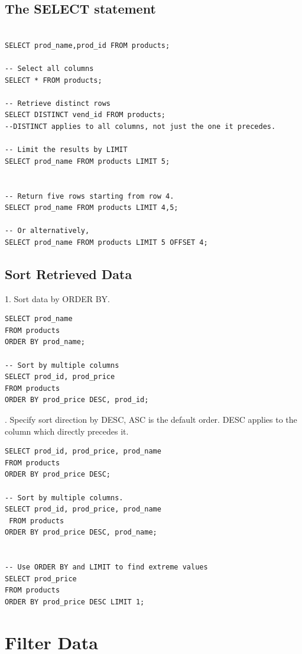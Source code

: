 \documentclass[12pt,oneside,a4paper]{article}
\begin{document}
\subsection{The \textsf{SELECT} statement} 

\begin{lstlisting}

SELECT prod_name,prod_id FROM products;

-- Select all columns 
SELECT * FROM products;

-- Retrieve distinct rows 
SELECT DISTINCT vend_id FROM products; 
--DISTINCT applies to all columns, not just the one it precedes.

-- Limit the results by LIMIT 
SELECT prod_name FROM products LIMIT 5;


-- Return five rows starting from row 4.
SELECT prod_name FROM products LIMIT 4,5;

-- Or alternatively, 
SELECT prod_name FROM products LIMIT 5 OFFSET 4;
\end{lstlisting}

\subsection{Sort Retrieved Data}
1. Sort data by \textsf{ORDER BY}. \\
\begin{lstlisting}
SELECT prod_name 
FROM products 
ORDER BY prod_name;

-- Sort by multiple columns 
SELECT prod_id, prod_price 
FROM products 
ORDER BY prod_price DESC, prod_id;
\end{lstlisting} 

. Specify sort direction by \textsf{DESC}, \textsf{ASC} is the default order. \textsf{DESC} applies to the column which directly precedes it. 
\begin{lstlisting}
SELECT prod_id, prod_price, prod_name 
FROM products 
ORDER BY prod_price DESC;

-- Sort by multiple columns.
SELECT prod_id, prod_price, prod_name
 FROM products 
ORDER BY prod_price DESC, prod_name;


-- Use ORDER BY and LIMIT to find extreme values 
SELECT prod_price 
FROM products 
ORDER BY prod_price DESC LIMIT 1;

\end{lstlisting}


\section{Filter Data}
\end{document}
